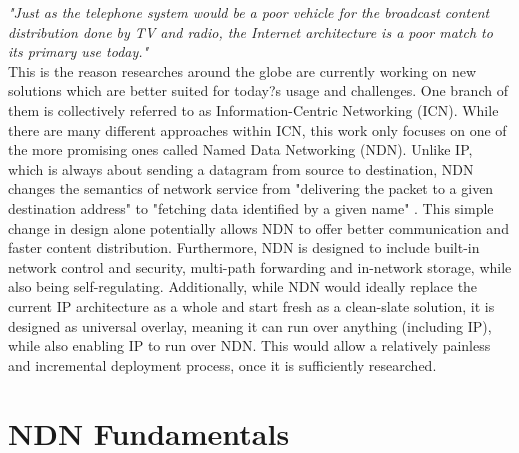 \textit{ "Just as the telephone system would be a poor vehicle for the broadcast content distribution done by TV and radio, the Internet architecture is a poor match to its primary use today."} \\

This is the reason researches around the globe are currently working on new solutions which are better suited for today?s usage and challenges. One branch of them is collectively referred to as Information-Centric Networking (ICN). While there are many different approaches within ICN, this work only focuses on one of the more promising ones called Named Data Networking (NDN). Unlike IP, which is always about sending a datagram from source to destination, NDN changes the semantics of network service from "delivering the packet to a given destination address" to "fetching data identified by a given name" \cite{ZABJ14}. This simple change in design alone potentially allows NDN to offer better communication and faster content distribution. Furthermore, NDN is designed to include built-in network control and security, multi-path forwarding and in-network storage, while also being self-regulating. Additionally, while NDN would ideally replace the current IP architecture as a whole and start fresh as a clean-slate solution, it is designed as universal overlay, meaning it can run over anything (including IP), while also enabling IP to run over NDN. This would allow a relatively painless and incremental deployment process, once it is sufficiently researched. \cite{ZEBJ10, ZABJ14}

\section{NDN Fundamentals}

